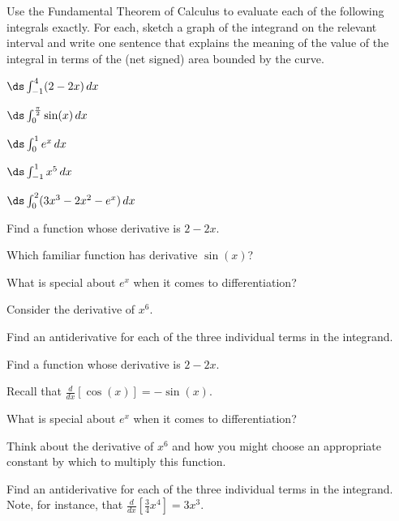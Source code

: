 \begin{activity} \label{A:4.4.1}  Use the Fundamental Theorem of Calculus to evaluate each of the following integrals exactly.  For each, sketch a graph of the integrand on the relevant interval and write one sentence that explains the meaning of the value of the integral in terms of the (net signed) area bounded by the curve.
\ba
	\item $\ds \int_{-1}^4 (2-2x) \, dx$
	\item $\ds \int_{0}^{\frac{\pi}{2}} \sin(x) \, dx$
	\item $\ds \int_0^1 e^x \, dx$
	\item $\ds \int_{-1}^{1} x^5 \, dx$
	\item $\ds \int_0^2 (3x^3 - 2x^2 - e^x) \, dx$
\ea
\end{activity}
\begin{smallhint}
\ba
	\item Find a function whose derivative is $2 - 2x$.
	\item Which familiar function has derivative $\sin(x)$?
	\item What is special about $e^x$ when it comes to differentiation?
	\item Consider the derivative of $x^6$.
	\item Find an antiderivative for each of the three individual terms in the integrand.
\ea
\end{smallhint}
\begin{bighint}
\ba
	\item Find a function whose derivative is $2 - 2x$.
	\item Recall that $\frac{d}{dx}[\cos(x)] = -\sin(x)$.
	\item What is special about $e^x$ when it comes to differentiation?
	\item Think about the derivative of $x^6$ and how you might choose an appropriate constant by which to multiply this function.
	\item Find an antiderivative for each of the three individual terms in the integrand.  Note, for instance, that $\frac{d}{dx} [\frac{3}{4} x^4 ] = 3x^3.$
\ea
\end{bighint}
